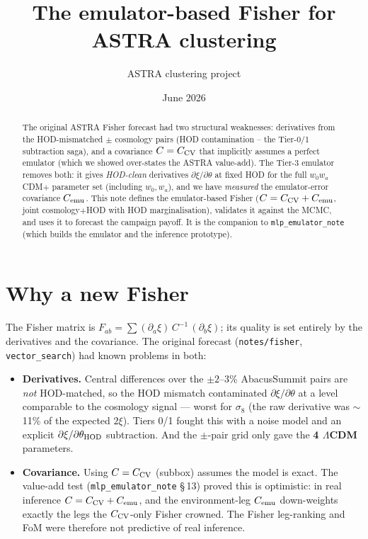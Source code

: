 \documentclass[11pt]{article}
\title{The emulator-based Fisher for ASTRA clustering}
\author{ASTRA clustering project}\date{June 2026}
\newcommand{\code}[1]{\texttt{#1}}
\begin{document}
\maketitle

\begin{abstract}
The original ASTRA Fisher forecast had two structural weaknesses: derivatives from
the HOD-mismatched $\pm$ cosmology pairs (HOD contamination -- the Tier-0/1 subtraction
saga), and a covariance $C=C_{\rm CV}$ that implicitly assumes a perfect emulator (which
we showed over-states the ASTRA value-add). The Tier-3 emulator removes both: it gives
\emph{HOD-clean} derivatives $\partial\xi/\partial\theta$ at fixed HOD for the full
$w_0w_a$CDM$+$ parameter set (including $w_0,w_a$), and we have \emph{measured} the
emulator-error covariance $C_{\rm emu}$. This note defines the emulator-based Fisher
($C=C_{\rm CV}+C_{\rm emu}$, joint cosmology$+$HOD with HOD marginalisation), validates
it against the MCMC, and uses it to forecast the campaign payoff. It is the companion to
\code{mlp\_emulator\_note} (which builds the emulator and the inference prototype).
\end{abstract}

\section{Why a new Fisher}
The Fisher matrix is $F_{ab}=\sum (\partial_a\xi)\,C^{-1}\,(\partial_b\xi)$; its quality
is set entirely by the derivatives and the covariance. The original forecast
(\code{notes/fisher}, \code{vector\_search}) had known problems in both:
\begin{itemize}
\item \textbf{Derivatives.} Central differences over the $\pm2$--$3\%$ AbacusSummit
  pairs are \emph{not} HOD-matched, so the HOD mismatch contaminated
  $\partial\xi/\partial\theta$ at a level comparable to the cosmology signal --- worst
  for $\sigma_8$ (the raw derivative was $\sim$11\% of the expected $2\xi$). Tiers 0/1
  fought this with a noise model and an explicit $\partial\xi/\partial\theta_{\rm HOD}$
  subtraction. And the $\pm$-pair grid only gave the \textbf{4 $\Lambda$CDM} parameters.
\item \textbf{Covariance.} Using $C=C_{\rm CV}$ (subbox) assumes the model is exact. The
  value-add test (\code{mlp\_emulator\_note} \S\,13) proved this is optimistic: in real
  inference $C=C_{\rm CV}+C_{\rm emu}$, and the environment-leg $C_{\rm emu}$ down-weights
  exactly the legs the $C_{\rm CV}$-only Fisher crowned. The Fisher leg-ranking and FoM
  were therefore not predictive of real inference.
\end{itemize}
\end{document}

